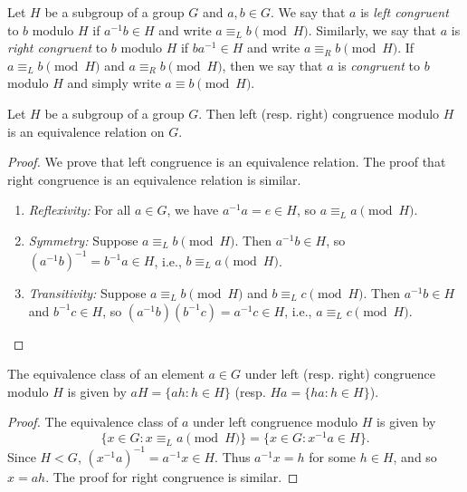 \begin{definition}
    Let \(H\) be a subgroup of a group \(G\) and \(a, b \in G\). We say that \(a\) is \emph{left congruent} to \(b\) modulo \(H\) if \(a^{-1}b \in H\) and write \(a \equiv_L b \pmod{H}\). Similarly, we say that \(a\) is \emph{right congruent} to \(b\) modulo \(H\) if \(ba^{-1} \in H\) and write \(a \equiv_R b \pmod{H}\). If \(a \equiv_L b \pmod{H}\) and \(a \equiv_R b \pmod{H}\), then we say that \(a\) is \emph{congruent} to \(b\) modulo \(H\) and simply write \(a \equiv b \pmod{H}\).
\end{definition}

\begin{theorem}
    Let \(H\) be a subgroup of a group \(G\). Then left (resp. right) congruence modulo \(H\) is an equivalence relation on \(G\).
\end{theorem}

\begin{proof}
    We prove that left congruence is an equivalence relation. The proof that right congruence is an equivalence relation is similar.

    \begin{enumerate}
        \item \emph{Reflexivity:} For all \(a \in G\), we have \(a^{-1}a = e \in H\), so \(a \equiv_L a \pmod{H}\).
        \item \emph{Symmetry:} Suppose \(a \equiv_L b \pmod{H}\). Then \(a^{-1}b \in H\), so \((a^{-1}b)^{-1} = b^{-1}a \in H\), i.e., \(b \equiv_L a \pmod{H}\).
        \item \emph{Transitivity:} Suppose \(a \equiv_L b \pmod{H}\) and \(b \equiv_L c \pmod{H}\). Then \(a^{-1}b \in H\) and \(b^{-1}c \in H\), so \((a^{-1}b)(b^{-1}c) = a^{-1}c \in H\), i.e., \(a \equiv_L c \pmod{H}\).
    \end{enumerate}
\end{proof}

\begin{theorem}
    \label{thm:cosets-equiv-classes}
    The equivalence class of an element \(a \in G\) under left (resp. right) congruence modulo \(H\) is given by \(aH = \{ah : h \in H\}\) (resp. \(Ha = \{ha : h \in H\}\)).
\end{theorem}

\begin{proof}
    The equivalence class of \(a\) under left congruence modulo \(H\) is given by
    \[
        \{ x \in G : x \equiv_L a \pmod{H} \} = \{ x \in G : x^{-1}a \in H \}.
    \]
    Since \(H < G\), \((x^{-1}a)^{-1} = a^{-1}x \in H\). Thus \(a^{-1}x = h\) for some \(h \in H\), and so \(x = ah\). The proof for right congruence is similar.
\end{proof}

